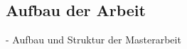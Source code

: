 \subsection{Aufbau der Arbeit} \label{sec:Aufbau der Arbeit}

- Aufbau und Struktur der Masterarbeit